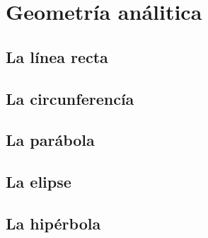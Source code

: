 \documentclass[12pt]{article}
\begin{document}
\newpage
\section{Geometría análitica}

\subsection{La línea recta}

\subsection{La circunferencía}

\subsection{La parábola}

\subsection{La elipse}

\subsection{La hipérbola}
\end{document}
